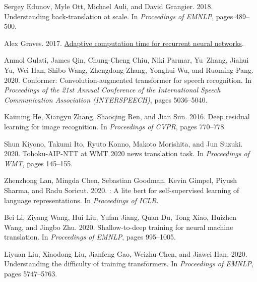 \documentclass[11pt]{article}
\begin{document}
\begin{thebibliography}{37}
Sergey Edunov, Myle Ott, Michael Auli, and David Grangier. 2018.
\newblock Understanding back-translation at scale.
\newblock In \emph{Proceedings of EMNLP}, pages 489--500.

Alex Graves. 2017.
\newblock \href {http://arxiv.org/abs/1603.08983} {Adaptive computation time
  for recurrent neural networks}.

Anmol Gulati, James Qin, Chung-Cheng Chiu, Niki Parmar, Yu~Zhang, Jiahui Yu,
  Wei Han, Shibo Wang, Zhengdong Zhang, Yonghui Wu, and Ruoming Pang. 2020.
\newblock Conformer: Convolution-augmented transformer for speech recognition.
\newblock In \emph{Proceedings of the 21st Annual Conference of the
  International Speech Communication Association (INTERSPEECH)}, pages
  5036--5040.

Kaiming He, Xiangyu Zhang, Shaoqing Ren, and Jian Sun. 2016.
\newblock Deep residual learning for image recognition.
\newblock In \emph{Proceedings of CVPR}, pages 770--778.

Shun Kiyono, Takumi Ito, Ryuto Konno, Makoto Morishita, and Jun Suzuki. 2020.
\newblock Tohoku-{AIP}-{NTT} at {WMT} 2020 news translation task.
\newblock In \emph{Proceedings of WMT}, pages 145--155.

Zhenzhong Lan, Mingda Chen, Sebastian Goodman, Kevin Gimpel, Piyush Sharma, and
  Radu Soricut. 2020.
: A lite bert for self-supervised learning of language
  representations.
\newblock In \emph{Proceedings of ICLR}.

Bei Li, Ziyang Wang, Hui Liu, Yufan Jiang, Quan Du, Tong Xiao, Huizhen Wang,
  and Jingbo Zhu. 2020.
\newblock Shallow-to-deep training for neural machine translation.
\newblock In \emph{Proceedings of EMNLP}, pages 995--1005.

Liyuan Liu, Xiaodong Liu, Jianfeng Gao, Weizhu Chen, and Jiawei Han. 2020.
\newblock Understanding the difficulty of training transformers.
\newblock In \emph{Proceedings of EMNLP}, pages 5747--5763.


\end{thebibliography}
\end{document}
